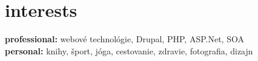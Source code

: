 \documentclass[]{friggeri-cv} %
\begin{document}



\section{interests}

\textbf{professional:} webové technológie, Drupal, PHP, ASP.Net, SOA \\
\textbf{personal:} knihy, šport, jóga, cestovanie, zdravie, fotografia, dizajn

\end{document}
